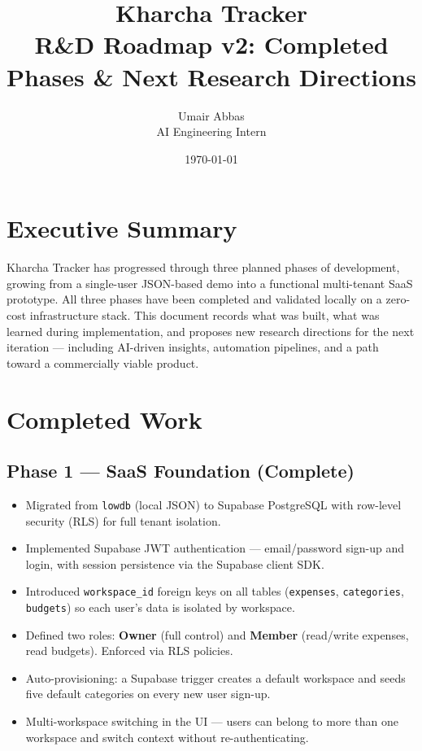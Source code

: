 \documentclass[11pt,a4paper]{article}
\title{%
  \textbf{\Large Kharcha Tracker} \\[4pt]
  \large R\&D Roadmap v2: Completed Phases \& Next Research Directions
}
\author{Umair Abbas \\ AI Engineering Intern}
\date{\today}
\begin{document}
\maketitle
\thispagestyle{empty}

\section*{Executive Summary}

Kharcha Tracker has progressed through three planned phases of development,
growing from a single-user JSON-based demo into a functional multi-tenant SaaS
prototype. All three phases have been completed and validated locally on a
zero-cost infrastructure stack. This document records what was built, what was
learned during implementation, and proposes new research directions for the next
iteration — including AI-driven insights, automation pipelines, and a path
toward a commercially viable product.

\section{Completed Work}

\subsection*{Phase 1 — SaaS Foundation \textnormal{\small\color{phasegreen}(Complete)}}

\begin{itemize}[leftmargin=1.2cm]
  \item Migrated from \texttt{lowdb} (local JSON) to Supabase PostgreSQL with
        row-level security (RLS) for full tenant isolation.
  \item Implemented Supabase JWT authentication — email/password sign-up and
        login, with session persistence via the Supabase client SDK.
  \item Introduced \texttt{workspace\_id} foreign keys on all tables
        (\texttt{expenses}, \texttt{categories}, \texttt{budgets}) so each user's
        data is isolated by workspace.
  \item Defined two roles: \textbf{Owner} (full control) and \textbf{Member}
        (read/write expenses, read budgets). Enforced via RLS policies.
  \item Auto-provisioning: a Supabase trigger creates a default workspace and
        seeds five default categories on every new user sign-up.
  \item Multi-workspace switching in the UI — users can belong to more than one
        workspace and switch context without re-authenticating.
\end{itemize}
\end{document}
